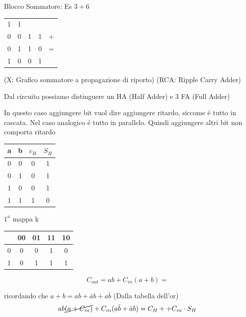 \documentclass{article}
\begin{document}
Blocco Sommatore: Es $3+6$

\begin{tabular}{c c c c c}
    1 & 1 & \\
    0 & 0 & 1 & 1 & + \\
    0 & 1 & 1 & 0 & = \\
    \hline
    1 & 0 & 0 & 1
\end{tabular}

(X: Grafico sommatore a propagazione di riporto)
(RCA: Ripple Carry Adder)

Dal circuito possiamo distinguere un HA (Half Adder) e 3 FA (Full Adder)

In questo caso aggiungere bit vuol dire aggiungere ritardo, siccome \'e tutto in cascata. Nel caso analogico \'e tutto in parallelo. Quindi aggiungere altri bit non comporta ritardo

\begin{tabular}{c c|c c}
    a & b & $c_H$ & $S_H$\\
    \hline
    0 & 0 & 0 & 1 \\
    0 & 1 & 0 & 1 \\
    1 & 0 & 0 & 1 \\
    1 & 1 & 1 & 0
\end{tabular}


$1^a$ mappa k
\begin{center}
    \begin{tabular}{c|c c c c}
    & 00 & 01 & 11 & 10\\
    \hline
        0 & 0 & 0 & 1 & 0\\
        1 & 0 & 1 & 1 & 1\\
    \end{tabular}
\end{center}
\[ C_{out} = ab + C_{in} (a+b) = \]

ricordando che $a + b = ab + \bar{a}b + a\bar{b}$ (Dalla tabella dell'or)
\[ ab \cancel{(a + C_{in})} + C_{in}(a\bar{b} + \bar{a}b) = C_H ++ C_{in} \cdot S_H \]
\end{document}
